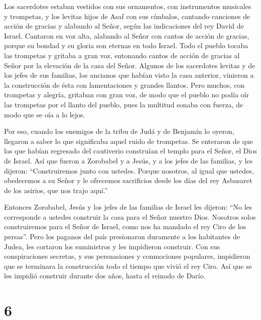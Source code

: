  Los sacerdotes estaban vestidos con sus ornamentos, con
instrumentos musicales y trompetas, y los levitas hijos de Asaf con sus
címbalos,  cantando canciones de acción de gracias y
alabando al Señor, según las indicaciones del rey David de Israel.
 Cantaron en voz alta, alabando al Señor con cantos de
acción de gracias, porque su bondad y su gloria son eternas en todo
Israel.  Todo el pueblo tocaba las trompetas y gritaba a
gran voz, entonando cantos de acción de gracias al Señor por la
elevación de la casa del Señor.  Algunos de los
sacerdotes levitas y de los jefes de sus familias, los ancianos que
habían visto la casa anterior, vinieron a la construcción de ésta con
lamentaciones y grandes llantos.  Pero muchos, con
trompetas y alegría, gritaban con gran voz,  de modo que
el pueblo no podía oír las trompetas por el llanto del pueblo, pues la
multitud sonaba con fuerza, de modo que se oía a lo lejos.

 Por eso, cuando los enemigos de la tribu de Judá y de
Benjamín lo oyeron, llegaron a saber lo que significaba aquel ruido de
trompetas.  Se enteraron de que los que habían regresado
del cautiverio construían el templo para el Señor, el Dios de Israel.
 Así que fueron a Zorobabel y a Jesús, y a los jefes de
las familias, y les dijeron: ``Construiremos junto con ustedes.
 Porque nosotros, al igual que ustedes, obedecemos a su
Señor y le ofrecemos sacrificios desde los días del rey Asbasaret de los
asirios, que nos trajo aquí.''

 Entonces Zorobabel, Jesús y los jefes de las familias de
Israel les dijeron: ``No les corresponde a ustedes construir la casa
para el Señor nuestro Dios.  Nosotros solos construiremos
para el Señor de Israel, como nos ha mandado el rey Ciro de los
persas''.  Pero los paganos del país presionaron
duramente a los habitantes de Judea, les cortaron los suministros y les
impidieron construir.  Con sus conspiraciones secretas, y
sus persuasiones y conmociones populares, impidieron que se terminara la
construcción todo el tiempo que vivió el rey Ciro. Así que se les
impidió construir durante dos años, hasta el reinado de Darío.

\hypertarget{section-5}{%
\section{6}\label{section-5}}

